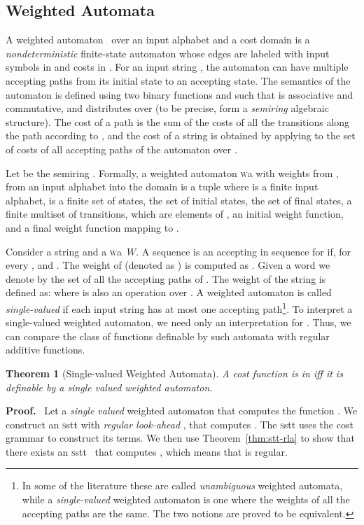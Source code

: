 \documentclass[11pt]{article}
\newtheorem{theorem}{Theorem}
\def\Proof{{\bf Proof.}}
\newcommand{\mypar}[1]{\subsection{#1}}
\newcommand{\SSTT}{{\sc\textsc sstt}\xspace}
\newcommand{\WA}{{\sc\textsc wa}\xspace}
\newcommand{\wa}{\ensuremath{W}}
\newcommand{\thmref}[1]{Theorem~\ref{thm:#1}\xspace}
\begin{document}
\mypar{Weighted Automata}\label{wa}
A weighted automaton~\cite{droste_handbook_2009} over an input
alphabet  and a cost domain  is a {\em
nondeterministic\/} finite-state automaton whose edges are labeled
with input symbols in  and costs in .  For an input
string , the automaton can have multiple accepting paths from its
initial state to an accepting state.  The semantics of the automaton
is defined using two binary functions  and  such
that  is associative and commutative, and 
distributes over  (to be precise, form a {\em semiring\/}
algebraic structure).  The cost of a path is the sum of the costs of
all the transitions along the path according to , and the
cost of a string  is obtained by applying  to the set of
costs of all accepting paths of the automaton over .


Let  be the semiring .
Formally, a weighted automaton \WA with weights from , from an
input alphabet  into the domain  is a tuple  where  is a finite input alphabet,  is a
finite set of states,  the set of initial
states,  the set of final states,
  a finite multiset of transitions, which are elements of
,  an initial weight function, and  a final weight function mapping
 to .

Consider a string  and a \WA~\wa.  A
sequence  is an accepting
in sequence for  if, for every ,
 and .  The weight
of  (denoted as ) is computed as .  Given a word  we denote by 
the set of all the accepting paths of .  The weight  of the
string  is defined as: 
where  is also an operation over .  A weighted automaton
is called {\em single-valued} if each input string has at most one
accepting path\footnote{In some of the literature these are called
\emph{unambiguous} weighted automata, while a \emph{single-valued}
weighted automaton is one where the weights of all the accepting paths
are the same. The two notions are proved to be equivalent.}.  To
interpret a single-valued weighted automaton, we need only an
interpretation for . Thus, we can compare the class of
functions definable by such automata with regular additive functions.

\begin{theorem}[Single-valued Weighted Automata]\label{exprplus}
A cost function  is in 
iff it is definable by a single valued weighted automaton.
\end{theorem}
\Proof~ Let  a \emph{single valued} weighted automaton that
computes the function .  We construct an
\SSTT with \emph{regular look-ahead}
,
 that computes . The \SSTT  uses the cost
grammar  to construct its terms.  We then use
\thmref{stt-rla} to show that there exists an \SSTT~ that computes
, which means that  is regular.
\end{document}
